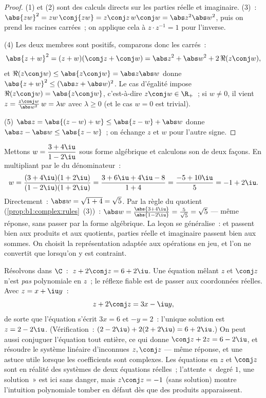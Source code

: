 \begin{proof}
(1) et (2) sont des calculs directs sur les parties réelle et
imaginaire. (3)~: $\abs{zw}^2 = zw\,\conj{zw} = z\conj z\, w \conj w =
\abs z^2 \abs w^2$, puis on prend les racines carrées~; on applique
cela à $z \cdot z^{-1} = 1$ pour l'inverse.

(4) Les deux membres sont positifs, comparons donc les carrés~:
\[
\abs{z+w}^2 = (z+w)(\conj z + \conj w)
= \abs z^2 + \abs w^2 + 2\,\Re(z \conj w),
\]
et $\Re(z\conj w) \leq \abs{z \conj w} = \abs z \abs w$ donne
$\abs{z+w}^2 \leq (\abs z + \abs w)^2$. Le cas d'égalité impose
$\Re(z \conj w) = \abs{z \conj w}$, c'est-à-dire $z \conj w \in \R_+$~;
si $w \neq 0$, il vient $z = \frac{z\conj w}{\abs w^2}\, w = \lambda w$
avec $\lambda \geq 0$ (et le cas $w = 0$ est trivial).

(5) $\abs z = \abs{(z - w) + w} \leq \abs{z-w} + \abs w$ donne $\abs z
- \abs w \leq \abs{z - w}$~; on échange $z$ et $w$ pour l'autre signe.
\end{proof}

\begin{example}\label{ex:b1:complex:workout}
Mettons $w = \dfrac{3 + 4\iu}{1 - 2\iu}$ sous forme algébrique et
calculons son  de deux façons. En multipliant par le
 du dénominateur~:
\[
w = \frac{(3 + 4\iu)(1 + 2\iu)}{(1 - 2\iu)(1 + 2\iu)}
= \frac{3 + 6\iu + 4\iu - 8}{1 + 4}
= \frac{-5 + 10\iu}{5} = -1 + 2\iu .
\]
Directement~: $\abs w = \sqrt{1 + 4} = \sqrt5$. Par la règle du
quotient (\cref{prop:b1:complex:rules}~(3))~: $\abs w = \frac{\abs{3 +
4\iu}}{\abs{1 - 2\iu}} = \frac5{\sqrt5} = \sqrt5$ --- même réponse,
sans passer par la forme algébrique. La leçon se généralise~:
 et  passent bien aux produits et aux quotients,
parties réelle et imaginaire passent bien aux sommes. On choisit la
représentation adaptée aux opérations en jeu, et l'on ne convertit
que lorsqu'on y est contraint.
\end{example}

\begin{example}\label{ex:b1:complex:conjeq}
Résolvons dans $\C$~: $\;z + 2\conj z = 6 + 2\iu$. Une équation
mêlant $z$ et $\conj z$ n'est \emph{pas} polynomiale en $z$~; le
réflexe fiable est de passer aux coordonnées réelles. Avec $z = x
+ \iu y$~:
\[
z + 2\conj z = 3x - \iu y ,
\]
de sorte que l'équation s'écrit $3x = 6$ et $-y = 2$~: l'unique
solution est $z = 2 - 2\iu$. (Vérification~: $(2 - 2\iu) + 2(2 +
2\iu) = 6 + 2\iu$.) On peut aussi conjuguer l'équation tout
entière, ce qui donne $\conj z + 2z = 6 - 2\iu$, et résoudre le
système linéaire d'inconnues $z, \conj z$ --- même réponse, et une
astuce utile lorsque les coefficients sont complexes. Les
équations en $z$ et $\conj z$ sont en réalité des systèmes de deux
équations réelles~; l'attente «~degré $1$, une solution~» est ici
sans danger, mais $z\conj z = -1$ (sans solution) montre
l'intuition polynomiale tomber en défaut dès que des produits
apparaissent.
\end{example}

